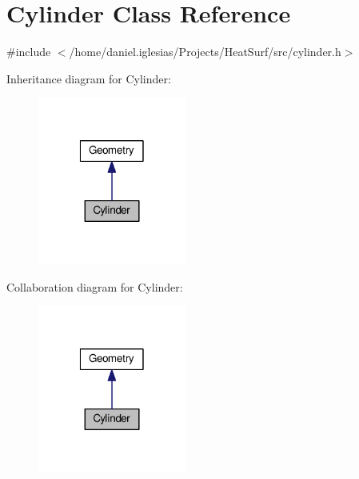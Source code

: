 \hypertarget{classCylinder}{\section{Cylinder Class Reference}
\label{classCylinder}
}


{\ttfamily \#include $<$/home/daniel.\-iglesias/\-Projects/\-Heat\-Surf/src/cylinder.\-h$>$}



Inheritance diagram for Cylinder\-:\nopagebreak
\begin{figure}[H]
\begin{center}
\leavevmode
\includegraphics[width=138pt]{classCylinder__inherit__graph}
\end{center}
\end{figure}


Collaboration diagram for Cylinder\-:\nopagebreak
\begin{figure}[H]
\begin{center}
\leavevmode
\includegraphics[width=138pt]{classCylinder__coll__graph}
\end{center}
\end{figure}
